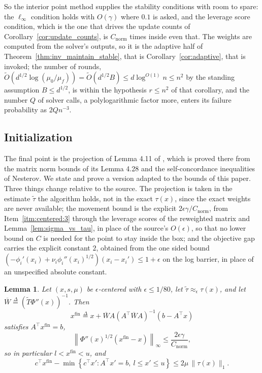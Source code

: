 \documentclass[11pt]{article}
\newtheorem{lemma}{Lemma}[section]
\renewcommand{\O}{\widetilde O}
\newcommand{\tautil}{\widetilde{\tau}}
\newcommand{\defeq}{\stackrel{\Delta}{=}}
\newcommand{\Cnorm}{C_{\mathrm{norm}}}
\begin{document}
So the interior point method supplies the stability conditions with room to
spare: the $\ell_\infty$ condition holds with
$O(\gamma)$ where
$0.1$ is asked, and the leverage score condition, which is the one that drives
the update counts of Corollary~\ref{cor:update_counts}, is $\Cnorm$ times inside
even that.
The weights are computed from the solver's outputs, so it is the adaptive half
of Theorem~\ref{thm:inv_maintain_stable}, that is Corollary~\ref{cor:adaptive},
that is invoked; the number of rounds,
$\O(d^{1/2} \log(\mu_0/\mu_f)) = \O(d^{1/2} B) \le d \log^{O(1)} n \le n^{2}$ by
the standing assumption $B \le d^{1/2}$, is within the hypothesis
$r \le n^{2}$ of that corollary, and the number
$Q$ of solver calls, a polylogarithmic factor more, enters its failure
probability as $2 Q n^{-3}$.

\subsection{Initialization}
\label{subsec:init}

The final point is the projection of Lemma 4.11 of
\cite{BLLSSSW21}, which is proved there from
the matrix norm bounds of its Lemma 4.28 and the self-concordance inequalities
of Nesterov.
We state and prove a version adapted to the bounds of this paper.
Three things change relative to the source.
The projection is taken in the estimate $\tautil$ the algorithm holds, not in
the exact $\tau(x)$, since the exact weights are never available; the movement
bound is the explicit $2 \epsilon \gamma / \Cnorm$, from
Item~\ref{itm:centered:3} through the leverage scores of the reweighted matrix
and Lemma~\ref{lem:sigma_vs_tau}, in place of the source's $O(\epsilon)$, so
that no lower bound on $C$ is needed for the point to stay inside the box; and
the objective gap carries the explicit constant $2$, obtained from the one sided
bound $(-\phi_i'(x_i) + \nu_i \phi_i''(x_i)^{1/2})(x_i - x_i') \le 1 + \epsilon$
on the log barrier, in place of an unspecified absolute constant.

\begin{lemma}
\label{lem:finalpoint}
Let $(x, s, \mu)$ be
$\epsilon$-centered with
$\epsilon \le 1/80$, let
$\tautil \approx_{\epsilon} \tau(x)$, and let
$\overline{W} \defeq (\widetilde T \Phi''(x))^{-1}$.
Then
\[
x^{\mathrm{fin}}
\defeq
x + \overline{W} A
\left( A^\top \overline{W} A \right)^{-1}
\left( b - A^\top x \right)
\]
satisfies $A^\top x^{\mathrm{fin}} = b$,
\[
\left\| \Phi''(x)^{1/2} \left( x^{\mathrm{fin}} - x \right) \right\|_{\infty}
\le
\frac{2 \epsilon \gamma}{\Cnorm} ,
\]
so in particular $l < x^{\mathrm{fin}} < u$, and
\[
c^\top x^{\mathrm{fin}}
- \min\left\{ c^\top x' : A^\top x' = b,\ l \le x' \le u \right\}
\le
2 \mu \, \|\tau(x)\|_1 .
\]
\end{lemma}
\end{document}

